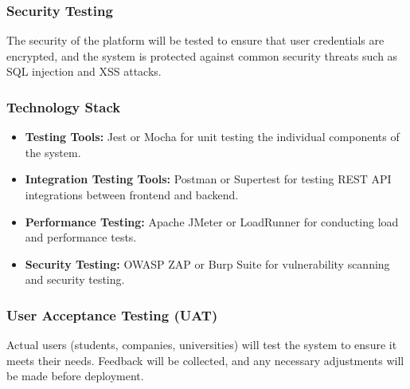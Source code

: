 \subsubsection{Security Testing}
The security of the platform will be tested to ensure that user credentials are encrypted, and the system is protected against common security threats such as SQL injection and XSS attacks.

\subsubsection{Technology Stack}

\begin{itemize}
    \item \textbf{Testing Tools:} Jest or Mocha for unit testing the individual components of the system.
    \item \textbf{Integration Testing Tools:} Postman or Supertest for testing REST API integrations between frontend and backend.
    \item \textbf{Performance Testing:} Apache JMeter or LoadRunner for conducting load and performance tests.
    \item \textbf{Security Testing:} OWASP ZAP or Burp Suite for vulnerability scanning and security testing.
\end{itemize}

\subsubsection{User Acceptance Testing (UAT)}
Actual users (students, companies, universities) will test the system to ensure it meets their needs. Feedback will be collected, and any necessary adjustments will be made before deployment.
